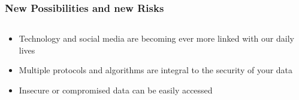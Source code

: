 \documentclass[12pt]{beamer}
\begin{document}
\begin{frame}
\frametitle{New Possibilities and new Risks}
\begin{columns}
\begin{column}{0.5\textwidth}
\begin{itemize}
\item<2-> Technology and social media are becoming ever more linked with our daily lives
\item<3-> Multiple protocols and algorithms are integral to the security of your data
\item<3-> Insecure or compromised data can be easily accessed
\end{itemize}
\end{column}
\begin{column}{0.5\textwidth}
 \break
{}
\end{column}
\end{columns}
\end{frame}
\end{document}
